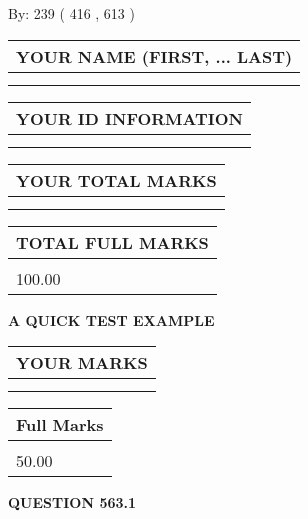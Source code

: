 \documentclass[12pt]{article}
\begin{document}
   
\hspace{1.0in} By: 
 239 ( 416 ,  613 )
   
   
   
   
\newpage 
\setcounter{page}{ 
   563001 } 
   
   
   
   
\noindent\begin{tabular}{|l|}
\hline
YOUR NAME (FIRST, ... LAST)  \\
\hline
 \\ 
 \\ 
\hline
\end{tabular}
\hspace{0.05in} \begin{tabular}{|l|}
\hline
 YOUR   ID   INFORMATION  \\
\hline
 \\ 
 \\ 
\hline
\end{tabular}
   
   
\vspace{0.2in}\noindent\begin{tabular}{|l|}
\hline
YOUR TOTAL MARKS  \\
\hline
 \\ 
 \\ 
\hline
\end{tabular}
\hspace{0.05in} \begin{tabular}{|l|}
\hline
TOTAL FULL MARKS  \\
\hline
 \\ 
100.00 \\
\hline
\end{tabular}
   
   
 \vspace{0.2in}
{\LARGE {\textbf{ A QUICK TEST EXAMPLE}}}
   
   
  
\vspace{0.2in}
  
\noindent\begin{tabular}{|l|}
\hline
 YOUR MARKS  \\
\hline
 \\ 
 \\ 
\hline
\end{tabular}
\hspace{0.05in} \begin{tabular}{|l|}
\hline
 Full Marks  \\
\hline
 \\ 
50.00 \\
\hline
\end{tabular}
{\textbf{\Large{QUESTION
563.1 
}}}
  
\end{document}

